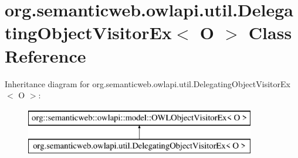 \hypertarget{classorg_1_1semanticweb_1_1owlapi_1_1util_1_1_delegating_object_visitor_ex_3_01_o_01_4}{\section{org.\-semanticweb.\-owlapi.\-util.\-Delegating\-Object\-Visitor\-Ex$<$ O $>$ Class Reference}
\label{classorg_1_1semanticweb_1_1owlapi_1_1util_1_1_delegating_object_visitor_ex_3_01_o_01_4}
}
Inheritance diagram for org.\-semanticweb.\-owlapi.\-util.\-Delegating\-Object\-Visitor\-Ex$<$ O $>$\-:\begin{figure}[H]
\begin{center}
\leavevmode
\includegraphics[height=2.000000cm]{classorg_1_1semanticweb_1_1owlapi_1_1util_1_1_delegating_object_visitor_ex_3_01_o_01_4}
\end{center}
\end{figure}
